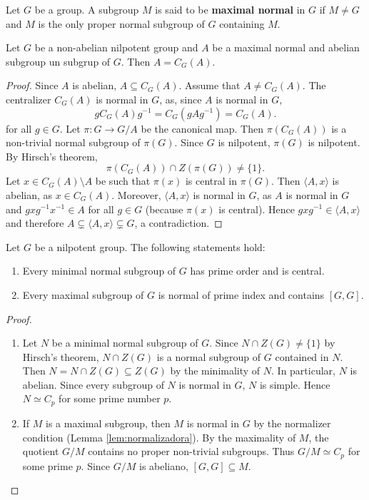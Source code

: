 \begin{definition}
    Let $G$ be a group. A subgroup $M$ is said to be \textbf{maximal normal} in $G$
    if $M\ne G$ and $M$ is the only proper normal subgroup of $G$ containing $M$. 
\end{definition}

\begin{corollary}
Let $G$ be a non-abelian nilpotent group and $A$ be a maximal normal and abelian 
subgroup un subgrup of $G$. Then $A=C_G(A)$.
\end{corollary}

\begin{proof}
Since $A$ is abelian, $A\subseteq C_G(A)$. Assume that $A\ne C_G(A)$.
The centralizer $C_G(A)$ is normal in $G$, as, since $A$ is normal in $G$, 
\[
gC_G(A)g^{-1}=C_G(gAg^{-1})=C_G(A).
\]
for all $g\in G$. Let $\pi\colon G\to G/A$ be the canonical map. 
Then $\pi(C_G(A))$ is a non-trivial normal subgroup of $\pi(G)$. Since 
$G$ is nilpotent, $\pi(G)$ is nilpotent. By Hirsch's theorem, 
\[
\pi(C_G(A))\cap Z(\pi(G))\ne\{1\}.
\]
Let $x\in C_G(A)\setminus A$ be such that $\pi(x)$ is central in $\pi(G)$.  Then 
$\langle A,x\rangle$ is abelian, as $x\in C_G(A)$. Moreover,  $\langle
A,x\rangle$ is normal in $G$, as $A$ is normal in $G$ and 
$gxg^{-1}x^{-1}\in A$ for all  $g\in G$ (because $\pi(x)$ is central). Hence
	$gxg^{-1}\in \langle A,x\rangle$ and therefore $A\subsetneq \langle
	A,x\rangle\subsetneq G$, a contradiction.
\end{proof}

\begin{theorem}
Let $G$ be a nilpotent group. The following statements hold: 
\begin{enumerate}
\item Every minimal normal subgroup of $G$ has prime order and is central. 
\item Every maximal subgroup of $G$ is normal of prime index and contains $[G,G]$. 
\end{enumerate}
\end{theorem}

\begin{proof}\
\begin{enumerate}
    \item Let $N$ be a minimal normal subgroup of $G$. Since 
        $N\cap Z(G)\ne\{1\}$ by Hirsch's theorem, $N\cap Z(G)$ is a normal subgroup of 
        $G$ contained in $N$. Then $N=N\cap Z(G)\subseteq
	Z(G)$ by the minimality of $N$. In particular, $N$ is abelian. Since every subgroup of 
         $N$ is normal in $G$, $N$ is simple. Hence $N\simeq
	C_p$ for some prime number $p$.
 \item  If $M$ is a maximal subgroup, then $M$
is normal in $G$ by the normalizer condition (Lemma \ref{lem:normalizadora}). By the maximality
of $M$, the quotient $G/M$ contains no proper non-trivial subgroups. Thus 
$G/M\simeq C_p$ for some prime $p$. Since 
	$G/M$ is abeliano, $[G,G]\subseteq M$. \qedhere 
\end{enumerate}
\end{proof}

